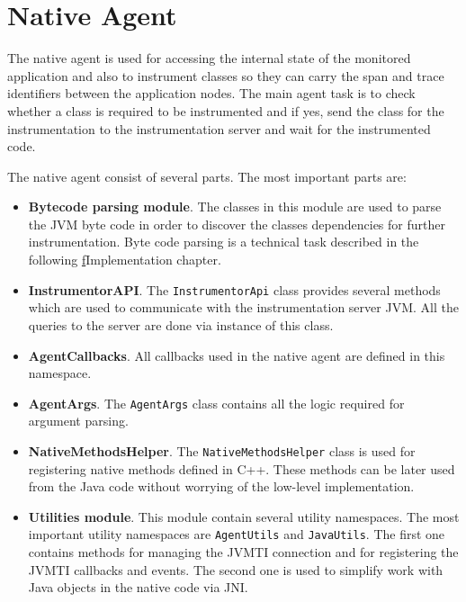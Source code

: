 \section{Native Agent}
\label{native_agent_design}
The native agent is used for accessing the internal state of the monitored application and also to instrument classes so they can carry the span and trace identifiers between the application nodes. The main agent task is to check whether a class is required to be instrumented and if yes, send the class for the instrumentation to the instrumentation server and wait for the instrumented code.

The native agent consist of several parts. The most important parts are:
\begin{itemize}
	\item \textbf{Bytecode parsing module}. \newline The classes in this module are used to parse the JVM byte code in order to discover the classes dependencies for further instrumentation. Byte code parsing is a technical task described in the following \hyperref[chap:implementation]f{Implementation} chapter.
	\item \textbf{InstrumentorAPI}. \newline The \texttt{InstrumentorApi} class provides several methods which are used to communicate with the instrumentation server JVM. All the queries to the server are done via instance of this class.
	\item \textbf{AgentCallbacks}. \newline All callbacks used in the native agent are defined in this namespace.
	\item \textbf{AgentArgs}.  \newline The \texttt{AgentArgs} class contains all the logic required for argument parsing.
	\item \textbf{NativeMethodsHelper}. \newline The \texttt{NativeMethodsHelper} class is used for registering native methods defined in C++. These methods can be later used from the Java code without worrying of the low-level implementation.
	\item \textbf{Utilities module}. \newline This module contain several utility namespaces. The most important utility namespaces are \texttt{AgentUtils} and \texttt{JavaUtils}. The first one contains methods for managing the JVMTI connection and for registering the JVMTI callbacks and events. The second one is used to simplify work with Java objects in the native code via JNI. 
\end{itemize}

